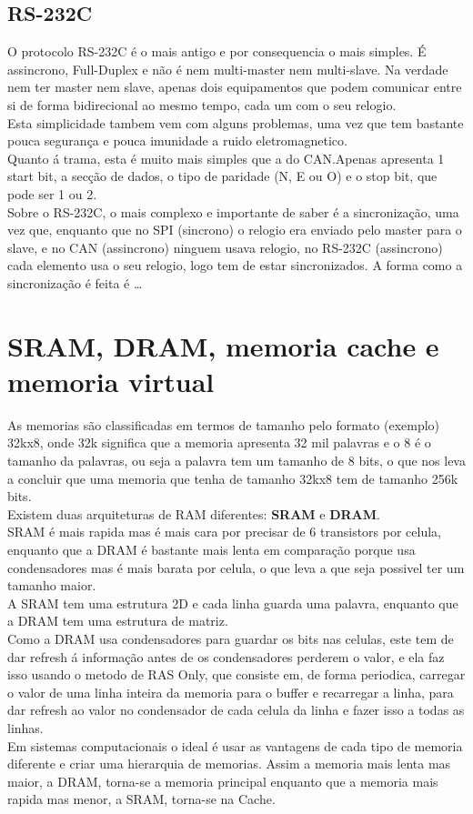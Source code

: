 \documentclass[a4paper, 11pt, onecolumn, oneside]{scrartcl}
\begin{document}
\subsection{RS-232C}
O protocolo RS-232C é o mais antigo e por consequencia o mais simples. É assincrono, Full-Duplex e não é nem multi-master nem multi-slave. Na verdade nem ter master nem slave, apenas
dois equipamentos que podem comunicar entre si de forma bidirecional ao mesmo tempo, cada um com o seu relogio.\\
Esta simplicidade tambem vem com alguns problemas, uma vez que tem bastante pouca segurança e pouca imunidade a ruido eletromagnetico.\\
\newline
Quanto á trama, esta é muito mais simples que a do CAN.\@ Apenas apresenta 1 start bit, a secção de dados, o tipo de paridade (N, E ou O) e o stop bit, que pode ser 1 ou 2.\\
\newline
Sobre o RS-232C, o mais complexo e importante de saber é a sincronização, uma vez que, enquanto que no SPI (sincrono) o relogio era enviado pelo master para o slave, e no CAN (assincrono) 
ninguem usava relogio, no RS-232C (assincrono) cada elemento usa o seu relogio, logo tem de estar sincronizados. A forma como a sincronização é feita é \dots 

\section{SRAM, DRAM, memoria cache e memoria virtual}
As memorias são classificadas em termos de tamanho pelo formato (exemplo) 32kx8, onde 32k significa que a memoria apresenta 32 mil palavras e o 8 é o tamanho da palavras, ou seja a palavra tem um 
tamanho de 8 bits, o que nos leva a concluir que uma memoria que tenha de tamanho 32kx8 tem de tamanho 256k bits.\\
\newline 
Existem duas arquiteturas de RAM diferentes: \textbf{SRAM} e \textbf{DRAM}.\\
SRAM é mais rapida mas é mais cara por precisar de 6 transistors por celula, enquanto que a DRAM é bastante mais lenta em comparação porque usa condensadores mas é mais barata por celula, o que 
leva a que seja possivel ter um tamanho maior.\\
A SRAM tem uma estrutura 2D e cada linha guarda uma palavra, enquanto que a DRAM tem uma estrutura de matriz.\\
Como a DRAM usa condensadores para guardar os bits nas celulas, este tem de dar refresh á informação antes de os condensadores perderem o valor, e ela faz isso usando o metodo de RAS Only, 
que consiste em, de forma periodica, carregar o valor de uma linha inteira da memoria para o buffer e recarregar a linha, para dar refresh ao valor no condensador de cada celula da linha e fazer 
isso a todas as linhas.\\
Em sistemas computacionais o ideal é usar as vantagens de cada tipo de memoria diferente e criar uma hierarquia de memorias. Assim a memoria mais lenta mas maior, 
a DRAM, torna-se a memoria principal enquanto que a memoria mais rapida mas menor, a SRAM, torna-se na Cache. 
\end{document}
